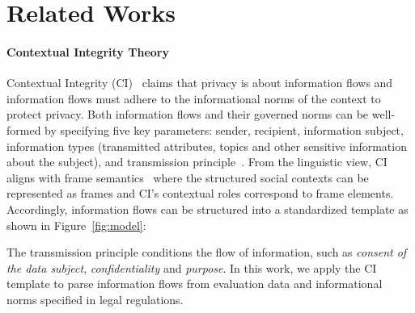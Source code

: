 \section{Related Works}
\label{sec: relate}

\paragraph{Contextual Integrity Theory}
Contextual Integrity (CI)~\cite{Nissenbaum-2010-CI} claims that privacy is about information flows and information flows must adhere to the informational norms of the context to protect privacy.
Both information flows and their governed norms can be well-formed by specifying five key parameters: sender, recipient, information subject, information types (transmitted attributes, topics and other sensitive information about the subject), and transmission principle~\cite{Benthall-CI-2017}.
From the linguistic view, CI aligns with frame semantics~\cite{baker-etal-1998-berkeley-framenet, palmer-etal-2005-proposition} where the structured social contexts can be represented as frames and CI's contextual roles correspond to frame elements.
Accordingly, information flows can be structured into a standardized template as shown in Figure~\ref{fig:model}:
\begin{center}
\vspace{-10pt}
\end{center}
The transmission principle conditions the flow of information, such as \textit{consent of the data subject}, \textit{confidentiality} and \textit{purpose}.
In this work, we apply the CI template to parse information flows from evaluation data and informational norms specified in legal regulations.



